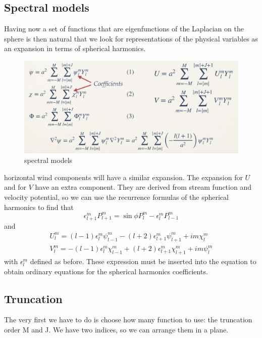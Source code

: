 \subsection{Spectral models}
Having now a set of functions that are eigenfunctions of the Laplacian on the sphere is then natural that we look for representations of the physical variables as an expansion in terms of spherical harmonics. 

\begin{figure}[h!]
    \centering
    \includegraphics[width=0.5\linewidth]{uploads/Screenshot 2024-11-17 203102.png}
    \caption{spectral models}
    \label{fig:enter-label}
\end{figure}
horizontal wind components will have a similar expansion. The expansion for $U$ and for $V$ have an extra component. They are derived from stream function and velocity potential, so we can use the recurrence formulas of the spherical harmonics to find that 
$$\epsilon_{l+1}^mP_{l+1}^m=\sin\phi P^m_l-\epsilon_l^mP^m_{l-1}$$
and 
\begin{align*}
    U_l^m=(l-1)\epsilon_l^m\psi^m_{l-1}-(l+2)\epsilon_{l+1}^m\psi_{l+1}^m+im\chi_l^m\\
    V_l^m=-(l-1)\epsilon_l^m\chi_{l-1}^m+(l+2)\epsilon_{l+1}^m\chi_{l+1}^m+im\psi_l^m
\end{align*}
with $\epsilon_l^m$ defined as before.
These expression must be inserted into the equation to obtain ordinary equations for the spherical harmonics coefficients. 
\subsection{Truncation}
The very first we have to do is choose how many function to
use: the truncation order M and J. We have two indices, so
we can arrange them in a plane. 


